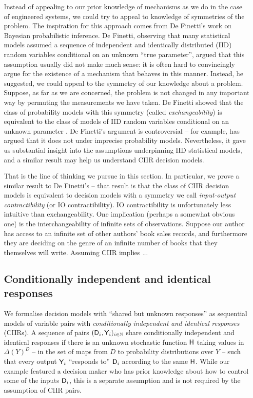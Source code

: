 Instead of appealing to our prior knowledge of mechanisms as we do in the case of engineered systems, we could try to appeal to knowledge of symmetries of the problem. The inspiration for this approach comes from De Finetti's work on Bayesian probabilistic inference. De Finetti, observing that many statistical models assumed a sequence of independent and identically distributed (IID) random variables conditional on an unknown ``true parameter'', argued that this assumption usually did not make much sense: it is often hard to convincingly argue for the existence of a mechanism that behaves in this manner. Instead, he suggested, we could appeal to the symmetry of our knowledge about a problem. Suppose, as far as we are concerned, the problem is not changed in any important way by permuting the measurements we have taken. De Finetti showed that the class of probability models with this symmetry (called \emph{exchangeability}) is equivalent to the class of models of IID random variables conditional on an unknown parameter \citep{de_finetti_foresight_1992}. De Finetti's argument is controversial -- for example, \citet{walley_statistical_1991} has argued that it does not under imprecise probability models. Nevertheless, it gave us substantial insight into the assumptions underpinning IID statistical models, and a similar result may help us understand CIIR decision models.

That is the line of thinking we pursue in this section. In particular, we prove a similar result to De Finetti's -- that result is that the class of CIIR decision models is equivalent to decision models with a symmetry we call \emph{input-output contractibility} (or IO contractibility). IO contractibility is unfortunately less intuitive than exchangeability. One implication (perhaps a somewhat obvious one) is the interchangeability of infinite sets of observations. Suppose our author has access to an infinite set of other authors' book sales records, and furthermore they are deciding on the genre of an infinite number of books that they themselves will write. Assuming CIIR implies ...



\subsection[Response functions]{Conditionally independent and identical responses}\label{sec:response_functions}

We formalise decision models with ``shared but unknown responses'' as sequential models of variable pairs with \emph{conditionally independent and identical responses} (CIIRs). A sequence of pairs $(\mathsf{D}_i,\mathsf{Y}_i)_{i\in \mathbb{N}}$ share conditionally independent and identical responses if there is an unknown stochastic function $\mathsf{H}$ taking values in $\Delta(Y)^D$ -- in the set of maps from $D$ to probability distributions over $Y$ -- such that every output $\mathsf{Y}_i$ ``responds to'' $\mathsf{D}_i$ according to the same $\mathsf{H}$. While our example featured a decision maker who has prior knowledge about how to control some of the inputs $\mathsf{D}_i$, this is a separate assumption and is not required by the assumption of CIIR pairs.

